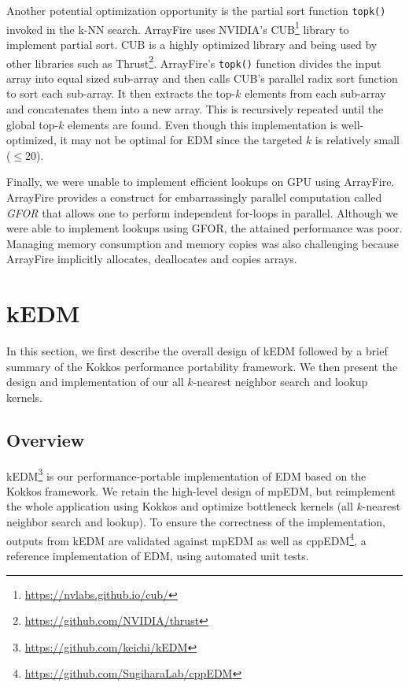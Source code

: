\documentclass[sigconf]{acmart}
\begin{document}
Another potential optimization opportunity is the partial sort function
\texttt{topk()} invoked in the k-NN search. ArrayFire uses NVIDIA's
CUB\footnote{\url{https://nvlabs.github.io/cub/}} library to implement partial
sort. CUB is a highly optimized library and being used by other libraries such
as Thrust\footnote{\url{https://github.com/NVIDIA/thrust}}. ArrayFire's
\texttt{topk()} function divides the input array into equal sized sub-array
and then calls CUB's parallel radix sort function to sort each sub-array. It
then extracts the top-$k$ elements from each sub-array and concatenates them
into a new array. This is recursively repeated until the global top-$k$
elements are found. Even though this implementation is well-optimized, it may
not be optimal for EDM since the targeted $k$ is relatively small ($\leq 20$).

Finally, we were unable to implement efficient lookups on GPU using ArrayFire.
ArrayFire provides a construct for embarrassingly parallel computation called
\textit{GFOR} that allows one to perform independent for-loops in parallel.
Although we were able to implement lookups using GFOR, the attained
performance was poor. Managing memory consumption and memory copies was also
challenging because ArrayFire implicitly allocates, deallocates and copies
arrays.

\section{kEDM}\label{sec:proposal}

In this section, we first describe the overall design of kEDM followed by a
brief summary of the Kokkos performance portability framework. We then present
the design and implementation of our all $k$-nearest neighbor search and
lookup kernels.

\subsection{Overview}

kEDM\footnote{\url{https://github.com/keichi/kEDM}} is our
performance-portable implementation of EDM based on the Kokkos framework. We retain the high-level design of mpEDM, but
reimplement the whole application using Kokkos and optimize bottleneck kernels
(all $k$-nearest neighbor search and lookup). To ensure the correctness of the
implementation, outputs from kEDM are validated against mpEDM as well as
cppEDM\footnote{\url{https://github.com/SugiharaLab/cppEDM}}, a reference
implementation of EDM, using automated unit tests.
\end{document}
